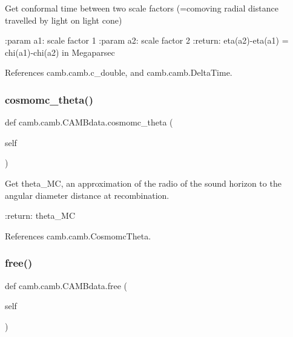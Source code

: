 \begin{DoxyVerb}Get conformal time between two scale factors (=comoving radial distance travelled by light on light cone)

:param a1: scale factor 1
:param a2: scale factor 2
:return: eta(a2)-eta(a1) = chi(a1)-chi(a2) in Megaparsec
\end{DoxyVerb}
 

References camb.\+camb.\+c\+\_\+double, and camb.\+camb.\+Delta\+Time.

\mbox{\label{classcamb_1_1camb_1_1CAMBdata_a7168fe972dc4ac167ae427fd91439ed2}} 
\subsubsection{\texorpdfstring{cosmomc\+\_\+theta()}{cosmomc\_theta()}}
{\footnotesize\ttfamily def camb.\+camb.\+C\+A\+M\+Bdata.\+cosmomc\+\_\+theta (\begin{DoxyParamCaption}\item[{}]{self }\end{DoxyParamCaption})}

\begin{DoxyVerb}Get theta_MC, an approximation of the radio of the sound horizon to the angular diameter distance at recombination.

:return: theta_MC
\end{DoxyVerb}
 

References camb.\+camb.\+Cosmomc\+Theta.

\mbox{\label{classcamb_1_1camb_1_1CAMBdata_ab591e03bed9e6aae5d00f6258db48e33}} 
\subsubsection{\texorpdfstring{free()}{free()}}
{\footnotesize\ttfamily def camb.\+camb.\+C\+A\+M\+Bdata.\+free (\begin{DoxyParamCaption}\item[{}]{self }\end{DoxyParamCaption})}



